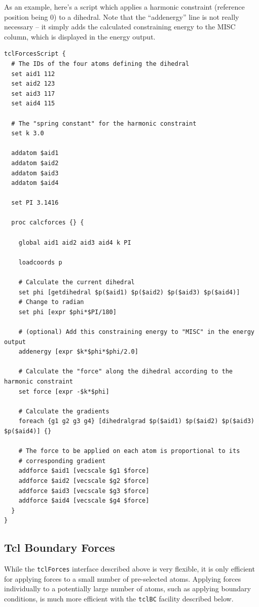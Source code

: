 As an example, here's a script which applies a harmonic
constraint (reference position being 0) to a dihedral. Note that
the ``addenergy'' line is not really necessary -- it simply adds
the calculated constraining energy to the MISC column, which is
displayed in the energy output.

\begin{verbatim}
tclForcesScript {
  # The IDs of the four atoms defining the dihedral
  set aid1 112
  set aid2 123
  set aid3 117
  set aid4 115
  
  # The "spring constant" for the harmonic constraint
  set k 3.0
  
  addatom $aid1
  addatom $aid2
  addatom $aid3
  addatom $aid4
  
  set PI 3.1416
  
  proc calcforces {} {
  
    global aid1 aid2 aid3 aid4 k PI
    
    loadcoords p
    
    # Calculate the current dihedral
    set phi [getdihedral $p($aid1) $p($aid2) $p($aid3) $p($aid4)]
    # Change to radian
    set phi [expr $phi*$PI/180]
    
    # (optional) Add this constraining energy to "MISC" in the energy output
    addenergy [expr $k*$phi*$phi/2.0]
    
    # Calculate the "force" along the dihedral according to the harmonic constraint
    set force [expr -$k*$phi]
    
    # Calculate the gradients
    foreach {g1 g2 g3 g4} [dihedralgrad $p($aid1) $p($aid2) $p($aid3) $p($aid4)] {}
    
    # The force to be applied on each atom is proportional to its
    # corresponding gradient
    addforce $aid1 [vecscale $g1 $force]
    addforce $aid2 [vecscale $g2 $force]
    addforce $aid3 [vecscale $g3 $force]
    addforce $aid4 [vecscale $g4 $force]
  }
}
\end{verbatim}


\subsection{Tcl Boundary Forces}
\label{section:tclBC}

While the {\tt tclForces} interface described above is very flexible, it is only
efficient for applying forces to a small number of pre-selected atoms.
Applying forces individually to a potentially large number of atoms, such
as applying boundary conditions, is much more efficient with the {\tt tclBC}
facility described below.


